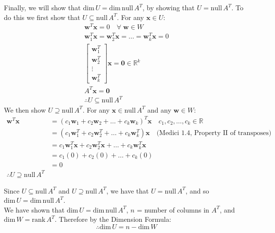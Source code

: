 \documentclass[10pt]{exam}
\begin{document}
{{			Finally, we will show that $\mbox{dim}\,U = \mbox{dim}\,\mathrm{null}\,A^T$, by showing that $U = \mathrm{null}\,A^T$. To do this we first show that $U \subseteq \mathrm{null}\,A^T$. For any $\textbf{x} \in U$:
			\begin{gather*}
				\textbf{w}^T \textbf{x} = 0 \quad \forall \;\textbf{w} \in W\\
				\textbf{w}_1^T \textbf{x} = \textbf{w}_2^T \textbf{x} = \dots = \textbf{w}_k^T \textbf{x} = 0\\
				\begin{bmatrix}\textbf{w}_1^T \\ \textbf{w}_2^T \\ \vdots \\ \textbf{w}_k^T \end{bmatrix} \textbf{x} = \textbf{0} \in {}\mathbb R^k\\
				A^T \textbf{x} = \textbf{0}\\
				\therefore U \subseteq \mathrm{null}\,A^T
			\end{gather*}
			We then show $U \supseteq \mathrm{null}\,A^T$. For any $\textbf{x} \in \mathrm{null}\,A^T$ and any $\textbf{w} \in W$:
			\begin{align*}
				\textbf{w}^T \textbf{x} &= (c_1\textbf{w}_1 + c_2\textbf{w}_2 + \dots + c_k\textbf{w}_k)^T \textbf{x} \quad c_1, c_2, \dots , c_k \in \mathbb{R}\\
				&= (c_1\textbf{w}_1^T + c_2\textbf{w}_2^T + \dots + c_k\textbf{w}_k^T) \textbf{x} \quad \text{(Medici 1.4, Property II of transposes)}\\
				&= c_1\textbf{w}_1^T \textbf{x} + c_2\textbf{w}_2^T \textbf{x} + \dots + c_k\textbf{w}_k^T \textbf{x}\\
				&= c_1(0) + c_2(0) + \dots + c_k(0)\\
				&= 0\\
				\therefore U \supseteq \mathrm{null}\,A^T
			\end{align*}
			
			Since $U \subseteq \mathrm{null}\,A^T$ and $U \supseteq \mathrm{null}\,A^T$, we have that $U = \mathrm{null}\,A^T$, and so $\mbox{dim}\,U = \mbox{dim}\,\mathrm{null}\,A^T$.\\

			We have shown that $\mbox{dim}\,U = \mbox{dim}\,\mathrm{null}\,A^T$, $n$ = number of columns in $A^T$, and $\mbox{dim}\,W = \mbox{rank}\,A^T$. Therefore by the Dimension Formula:
			\begin{displaymath}
				\therefore \mbox{dim}\,U = n - \mbox{dim}\,W
			\end{displaymath}


			}
		}
\end{document}
